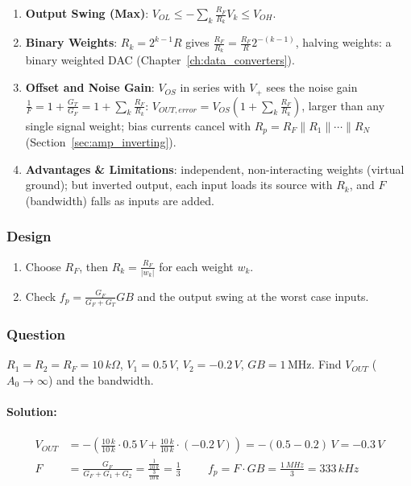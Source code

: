 \begin{enumerate}
    \paragraph{At Output:} as Section~\ref{sec:amp_inverting}, \(Z_{out} = \frac{R_o}{1 + AF}\).
  \item \textbf{Output Swing (Max)}: \(V_{OL} \leq -\sum_k \frac{R_F}{R_k} V_k \leq V_{OH}\).
  \item \textbf{Binary Weights}: \(R_k = 2^{k-1} R\) gives \(\frac{R_F}{R_k} = \frac{R_F}{R}2^{-(k-1)}\),
    halving weights: a binary weighted DAC (Chapter~\ref{ch:data_converters}).
  \item \textbf{Offset and Noise Gain}: \(V_{OS}\) in series with \(V_+\) sees the noise gain
    \(\frac{1}{F} = 1 + \frac{G_T}{G_F} = 1 + \sum_k \frac{R_F}{R_k}\): \(V_{OUT,error} = V_{OS}\left(1 + \sum_k \frac{R_F}{R_k}\right)\), larger than
    any single signal weight; bias currents cancel with \(R_p = R_F \parallel R_1 \parallel \cdots \parallel R_N\)
    (Section~\ref{sec:amp_inverting}).
  \item \textbf{Advantages \& Limitations}: independent, non-interacting weights
    (virtual ground); but inverted output, each input loads its source with \(R_k\), and
    \(F\) (bandwidth) falls as inputs are added.
\end{enumerate}

\subsubsection{Design}
\begin{enumerate}
  \item Choose \(R_F\), then \(R_k = \frac{R_F}{|w_k|}\) for each weight \(w_k\).
  \item Check \(f_p = \frac{G_F}{G_F + G_T} GB\) and the output swing at the worst case inputs.
\end{enumerate}

\subsubsection{Question}
\(R_1 = R_2 = R_F = 10\,k\Omega\), \(V_1 = 0.5\,V\), \(V_2 = -0.2\,V\),
\(GB = 1\,\)MHz. Find \(V_{OUT}\) (\(A_0 \to \infty\)) and the bandwidth.
\paragraph{Solution:}
\begin{align*}
  V_{OUT} &= -\left(\frac{10\,k}{10\,k} \cdot 0.5\,V + \frac{10\,k}{10\,k} \cdot (-0.2\,V)\right) = -(0.5 - 0.2)\,V = -0.3\,V \\
  F &= \frac{G_F}{G_F + G_1 + G_2} = \frac{\frac{1}{10\,k}}{\frac{3}{10\,k}} = \frac{1}{3} \hspace{1cm}
  f_p = F \cdot GB = \frac{1\,MHz}{3} = 333\,kHz
\end{align*}


